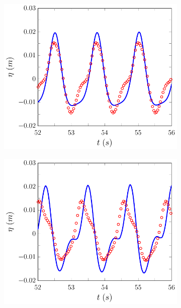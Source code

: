 \begin{figure}
	\centering
	\begin{subfigure}{0.5\textwidth}
		\includegraphics[width=\textwidth]{./chp6/figures/Experiment/Beji/sh/FEVMWG5.pdf}
		\vspace{0.5cm}
	\end{subfigure}%
	\begin{subfigure}{0.5\textwidth}
		\includegraphics[width=\textwidth]{./chp6/figures/Experiment/Beji/sh/FEVMWG6.pdf}

\end{subfigure}
\end{figure}
